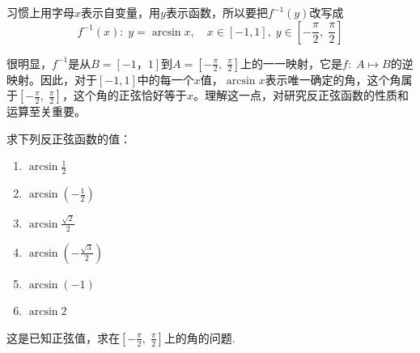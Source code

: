 习惯上用字母$x$表示自变量，用$y$表示函数，所以要把$f^{-1}(y)$改写成
\[f^{-1}(x):\; y=\arcsin x,\quad x\in[-1,1],\; y\in \left[-\frac{\pi}{2},\; \frac{\pi}{2}\right]\]    

很明显，$f^{-1}$是从$B=[-1，1]$到$A=\left[-\frac{\pi}{2},\; \frac{\pi}{2}\right]$上的一一映射，它是$f:\; A\mapsto B$的逆映射。因此，对于$[-1,1]$中的每一个$x$值，$\arcsin x$表示唯一确定的角，这个角属于$\left[-\frac{\pi}{2},\; \frac{\pi}{2}\right]$，这个角的正弦恰好等于$x$。理解这一点，对研究反正弦函数的性质和运算至关重要。

\begin{example}
    求下列反正弦函数的值：
\begin{multicols}{2}
\begin{enumerate}[(1)]
    \item $\arcsin \frac{1}{2}$
    \item $\arcsin \left(-\frac{1}{2}\right)$
    \item $\arcsin \frac{\sqrt{2}}{2}$
    \item $\arcsin \left(-\frac{\sqrt{3}}{2}\right)$
    \item $\arcsin (-1)$
    \item $\arcsin 2$
\end{enumerate}
\end{multicols}
\end{example}

\begin{analyze}
这是已知正弦值，求在$\left[-\frac{\pi}{2},\; \frac{\pi}{2}\right]$上的角的问题.
\end{analyze}

